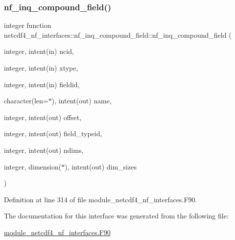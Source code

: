 \subsubsection{\texorpdfstring{nf\+\_\+inq\+\_\+compound\+\_\+field()}{nf\_inq\_compound\_field()}}
{\footnotesize\ttfamily integer function netcdf4\+\_\+nf\+\_\+interfaces\+::nf\+\_\+inq\+\_\+compound\+\_\+field\+::nf\+\_\+inq\+\_\+compound\+\_\+field (\begin{DoxyParamCaption}\item[{integer, intent(in)}]{ncid,  }\item[{integer, intent(in)}]{xtype,  }\item[{integer, intent(in)}]{fieldid,  }\item[{character(len=$\ast$), intent(out)}]{name,  }\item[{integer, intent(out)}]{offset,  }\item[{integer, intent(out)}]{field\+\_\+typeid,  }\item[{integer, intent(out)}]{ndims,  }\item[{integer, dimension($\ast$), intent(out)}]{dim\+\_\+sizes }\end{DoxyParamCaption})}



Definition at line 314 of file module\+\_\+netcdf4\+\_\+nf\+\_\+interfaces.\+F90.



The documentation for this interface was generated from the following file\+:\begin{DoxyCompactItemize}
\item 
\hyperlink{module__netcdf4__nf__interfaces_8F90}{module\+\_\+netcdf4\+\_\+nf\+\_\+interfaces.\+F90}\end{DoxyCompactItemize}

